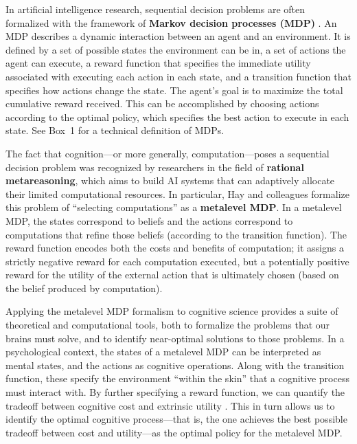 In artificial intelligence research, sequential decision problems are often formalized with the framework of \textbf{Markov decision processes (MDP)} \citep{puterman2014markov,sutton2018reinforcement}. An MDP describes a dynamic interaction between an agent and an environment. It is defined by a set of possible states the environment can be in, a set of actions the agent can execute, a reward function that specifies the immediate utility associated with executing each action in each state, and a transition function that specifies how actions change the state. The agent's goal is to maximize the total cumulative reward received. This can be accomplished by choosing actions according to the optimal policy, which specifies the best action to execute in each state. See Box~1 for a technical definition of MDPs.

The fact that cognition---or more generally, computation---poses a sequential decision problem was recognized by researchers in the field of \textbf{rational metareasoning}, which aims to build AI systems that can adaptively allocate their limited computational resources. In particular, Hay and colleagues \citealp{hay2012selecting,hay2016principles} formalize this problem of ``selecting computations'' as a \textbf{metalevel MDP}. In a metalevel MDP, the states correspond to beliefs and the actions correspond to computations that refine those beliefs (according to the transition function). The reward function encodes both the costs and benefits of computation; it assigns a strictly negative reward for each computation executed, but a potentially positive reward for the utility of the external action that is ultimately chosen (based on the belief produced by computation).

Applying the metalevel MDP formalism to cognitive science provides a suite of theoretical and computational tools, both to formalize the problems that our brains must solve, and to identify near-optimal solutions to those problems. In a psychological context, the states of a metalevel MDP can be interpreted as mental states, and the actions as cognitive operations. Along with the transition function, these specify the environment ``within the skin'' that a cognitive process must interact with. By further specifying a reward function, we can quantify the tradeoff between cognitive cost and extrinsic utility . This in turn allows us to identify the optimal cognitive process---that is, the one achieves the best possible tradeoff between cost and utility---as the optimal policy for the metalevel MDP.